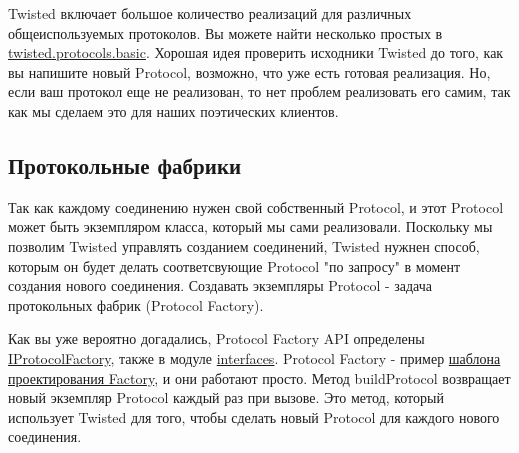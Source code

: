 
Twisted включает большое количество 
реализаций для различных общеиспользуемых протоколов. 
Вы можете найти несколько простых в 
\href{http://twistedmatrix.com/trac/browser/tags/releases/twisted-8.2.0/twisted/protocols/basic.py}{twisted.protocols.basic}. 
Хорошая идея проверить исходники Twisted до того, как 
вы напишите новый Protocol, возможно, что уже есть 
готовая реализация. Но, если ваш протокол еще не реализован, 
то нет проблем реализовать его самим, так как мы сделаем 
это для наших поэтических клиентов.


\subsection{Протокольные фабрики}


Так как каждому соединению нужен свой собственный Protocol, 
и этот Protocol может быть экземпляром класса, который мы 
сами реализовали. Поскольку мы позволим Twisted управлять 
созданием соединений, Twisted нужнен способ, которым он 
будет делать соответсвующие Protocol "по запросу" в момент 
создания нового соединения. Создавать экземпляры Protocol - 
задача протокольных фабрик (Protocol Factory). 


Как вы уже вероятно догадались, Protocol Factory API определены 
\href{http://twistedmatrix.com/trac/browser/tags/releases/twisted-8.2.0/twisted/internet/interfaces.py#L1259}{IProtocolFactory}, также в модуле  
\href{http://twistedmatrix.com/trac/browser/tags/releases/twisted-8.2.0/twisted/internet/interfaces.py}{interfaces}. 
Protocol Factory - пример \href{http://en.wikipedia.org/wiki/Factory\_pattern}{шаблона проектирования Factory}, и 
они работают просто. Метод buildProtocol возвращает новый экземпляр 
Protocol каждый раз при вызове. Это метод, который 
использует Twisted для того, чтобы сделать новый Protocol 
для каждого нового соединения.


